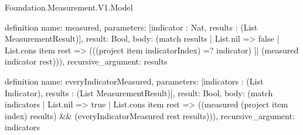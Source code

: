 \begin{lexlean}{Foundation.Measurement.V1.Model}
\begin{semanticmodule}
definition{
  name: measured,
  parameters: [indicator : Nat, results : (List MeasurementResult)],
  result: Bool,
  body: (match results
    | List.nil => false
    | List.cons item rest => (((project item indicatorIndex) =? indicator) || (measured indicator rest))),
  recursive_argument: results
}

definition{
  name: everyIndicatorMeasured,
  parameters: [indicators : (List Indicator), results : (List MeasurementResult)],
  result: Bool,
  body: (match indicators
    | List.nil => true
    | List.cons item rest => ((measured (project item index) results) && (everyIndicatorMeasured rest results))),
  recursive_argument: indicators
}
\end{semanticmodule}
\end{lexlean}
